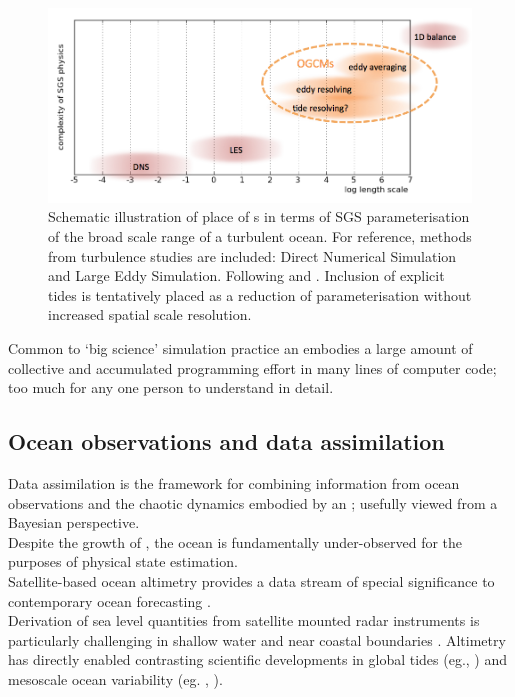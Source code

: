 \begin{figure}[h]\centering
  \includegraphics[width=120mm]{figures/diagrams/model_types_schematic.png}
  \caption{Schematic illustration of place of \OGCM{}s in terms of SGS parameterisation of the broad scale range of a turbulent ocean.  For reference, methods from turbulence studies are included: Direct Numerical Simulation and Large Eddy Simulation. Following \citep[fig 5.2]{Petersen:2012tr} and \citep{Stevens:2001kb}.  Inclusion of explicit tides is tentatively placed as a reduction of parameterisation without increased spatial scale resolution.}
  \label{fig:models}
\end{figure}

Common to `big science' simulation practice \citep{Petersen:2012tr} an \OGCM{} embodies a large amount of collective and accumulated programming effort in many lines of computer code; too much for any one person to understand in detail. \\



\subsection{Ocean observations and data assimilation}
Data assimilation is the framework for combining information from ocean observations and the chaotic dynamics embodied by an \OGCM{}; usefully viewed from a Bayesian perspective\citep{Zaron:2011ft}.\\
Despite the growth of \GOOS{} \citep{Komen:1999ch}, the ocean is fundamentally under-observed for the purposes of physical state estimation.\\


Satellite-based ocean altimetry provides a data stream of special significance to contemporary ocean forecasting \citep{Fu:2001ub}. \\
Derivation of sea level quantities from satellite mounted radar instruments is particularly challenging in shallow water and near coastal boundaries \citep{Woodworth:2011bf}. 
Altimetry has directly enabled contrasting scientific developments in global tides (eg.\citet{Egbert:1996vr},  \citet{Lefevre:2011dg}) and mesoscale ocean variability (eg.  \citet{Wunsch:1998bq}, \citet{Chelton:vi}).

